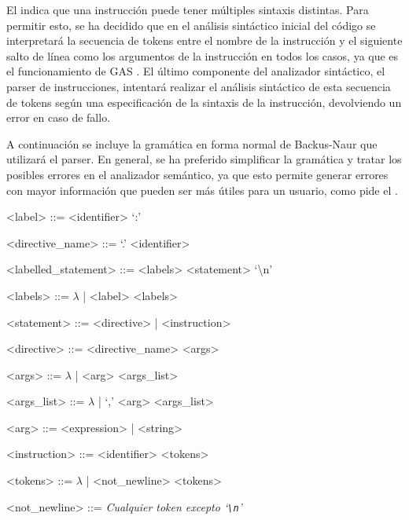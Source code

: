 El  indica que una instrucción puede tener
múltiples sintaxis distintas. Para permitir esto, se ha decidido que en el
análisis sintáctico inicial del código se interpretará la secuencia de
\glspl{token} entre el nombre de la instrucción y el siguiente salto de línea
como los argumentos de la instrucción en todos los casos, ya que es el
funcionamiento de \gls{GAS} \parencite{as-manual}. El último componente del
analizador sintáctico, el \gls{parser} de instrucciones, intentará realizar el
análisis sintáctico de esta secuencia de \glspl{token} según una especificación
de la sintaxis de la instrucción, devolviendo un error en caso de fallo.

A continuación se incluye la gramática en forma normal de Backus-Naur
\parencite{BNF} que utilizará el \gls{parser}. En general, se ha preferido
simplificar la gramática y tratar los posibles errores en el analizador
semántico, ya que esto permite generar errores con mayor información que pueden
ser más útiles para un usuario, como pide el . %

\newcommand{\EOL}{\textbackslash{}n}
\newcommand{\verbEOL}{`\texttt{\textbackslash{}n}'}

\begin{tcolorbox}[enhanced jigsaw,breakable,top=4mm]
    \begin{grammar}
       <label> ::= <identifier> `:'

       <directive\_name> ::= `.' <identifier>

       <labelled\_statement> ::= <labels> <statement> `\EOL'

       <labels> ::= $\lambda$ | <label> <labels>

       <statement> ::= <directive> | <instruction>

       <directive> ::= <directive\_name> <args>

       <args> ::= $\lambda$ | <arg> <args\_list>

       <args\_list> ::= $\lambda$ | `,' <arg> <args\_list>

       <arg> ::= <expression> | <string>

       <instruction> ::= <identifier> <tokens>

       <tokens> ::= $\lambda$ | <not\_newline> <tokens>

       <not\_newline> ::= \textit{Cualquier token excepto \verbEOL}
    \end{grammar}
\end{tcolorbox}

